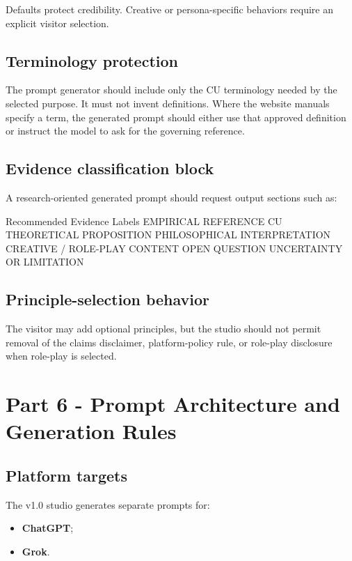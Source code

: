 \documentclass[11pt,letterpaper]{article}
\begin{document}
Defaults protect credibility. Creative or persona-specific behaviors require an
explicit visitor selection.

\subsection{Terminology protection}

The prompt generator should include only the CU terminology needed by the selected
purpose. It must not invent definitions. Where the website manuals specify a term,
the generated prompt should either use that approved definition or instruct the
model to ask for the governing reference.

\subsection{Evidence classification block}

A research-oriented generated prompt should request output sections such as:

\begin{codebox}{Recommended Evidence Labels}
EMPIRICAL REFERENCE
CU THEORETICAL PROPOSITION
PHILOSOPHICAL INTERPRETATION
CREATIVE / ROLE-PLAY CONTENT
OPEN QUESTION
UNCERTAINTY OR LIMITATION
\end{codebox}

\subsection{Principle-selection behavior}

The visitor may add optional principles, but the studio should not permit removal
of the claims disclaimer, platform-policy rule, or role-play disclosure when
role-play is selected.

\section{Part 6 - Prompt Architecture and Generation Rules}

\subsection{Platform targets}

The v1.0 studio generates separate prompts for:

\begin{itemize}
    \item \textbf{ChatGPT};
    \item \textbf{Grok}.
\end{itemize}
\end{document}
